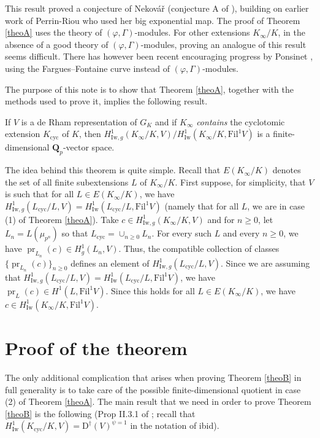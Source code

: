 \documentclass[12pt,english,a4paper]{smfart}
\newcommand{\Qp}{\mathbf{Q}_p}
\renewcommand{\phi}{\varphi}
\newcommand{\Iw}{\mathrm{Iw}}
\newcommand{\Fil}{\mathrm{Fil}}
\newcommand{\cyc}{\mathrm{cyc}}
\newcommand{\dfont}{\mathrm{D}}
\newcommand{\pr}{\operatorname{pr}}
\begin{document}
This result proved a conjecture of Nekov\'a\v{r} (conjecture A of \cite{PR00}), building on earlier work of Perrin-Riou \cite{PR00} who used her big exponential map. The proof of Theorem \ref{theoA} uses the theory of $(\phi,\Gamma)$-modules. For other extensions $K_\infty/K$, in the absence of a good theory of $(\phi,\Gamma)$-modules, proving an analogue of this result seems difficult. There has however been recent encouraging progress by Ponsinet \cite{Pon24,Pon25}, using the Fargues--Fontaine curve instead of $(\phi,\Gamma)$-modules. 

The purpose of this note is to show that Theorem \ref{theoA}, together with the methods used to prove it, implies the following result.

\begin{theo}
\label{theoB}
If $V$ is a de Rham representation of $G_K$ and if $K_\infty$ \emph{contains} the cyclotomic extension $K_{\cyc}$ of $K$, then $H^1_{\Iw,g}(K_\infty/K,V)  / H^1_{\Iw}(K_\infty/K,\Fil^1 V)$ is a finite-dimensional $\Qp$-vector space.
\end{theo}

The idea behind this theorem is quite simple. Recall that $E(K_\infty/K)$ denotes the set of all finite subextensions $L$ of $K_\infty / K$. First suppose, for simplicity, that $V$ is such that for all $L \in E(K_\infty/K)$, we have $H^1_{\Iw,g}(L_{\cyc}/L,V) = H^1_{\Iw}(L_{\cyc}/L,\Fil^1 V)$ (namely that for all $L$, we are in case (1) of Theorem \ref{theoA}). Take $c \in H^1_{\Iw,g}(K_\infty/K,V)$ and for $n \geq 0$, let $L_n = L(\mu_{p^n})$ so that $L_{\cyc} = \cup_{n \geq 0} L_n$. For every such $L$ and every $n \geq 0$, we have $\pr_{L_n}(c) \in H^1_g(L_n,V)$. Thus, the compatible collection of classes $\{ \pr_{L_n}(c) \}_{n \geq 0}$ defines an element of $H^1_{\Iw,g}(L_{\cyc}/L,V)$. Since we are assuming that $H^1_{\Iw,g}(L_{\cyc}/L,V) = H^1_{\Iw}(L_{\cyc}/L,\Fil^1 V)$, we have $\pr_L(c) \in H^1(L, \Fil^1 V)$. Since this holds for all $L \in E(K_\infty/K)$, we have $c \in H^1_{\Iw}(K_\infty/K,\Fil^1 V)$.

\section{Proof of the theorem}
\label{secproof}

The only additional complication that arises when proving Theorem \ref{theoB} in full generality is to take care of the possible finite-dimensional quotient in case (2) of Theorem \ref{theoA}. The main result that we need in order to prove Theorem \ref{theoB} is the following (Prop II.3.1 of \cite{Ber05}; recall that $H^1_{\Iw}(K_\cyc/K,V) = \dfont^\dagger(V)^{\psi=1}$ in the notation of ibid).
\end{document}
